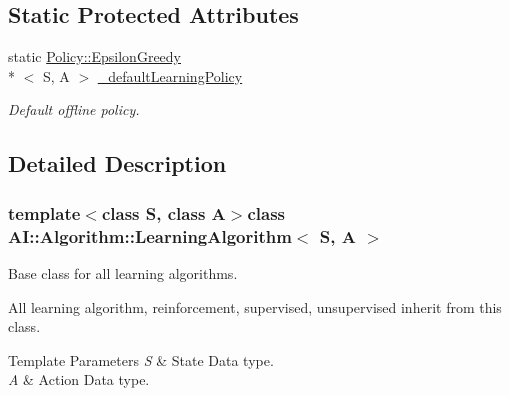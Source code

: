 \subsection*{Static Protected Attributes}
\begin{DoxyCompactItemize}
\item 
\hypertarget{classAI_1_1Algorithm_1_1LearningAlgorithm_ad9b3db3c2443e1a44803ec6d34887485}{static \hyperlink{classAI_1_1Algorithm_1_1Policy_1_1EpsilonGreedy}{Policy\+::\+Epsilon\+Greedy}\\*
$<$ S, A $>$ \hyperlink{classAI_1_1Algorithm_1_1LearningAlgorithm_ad9b3db3c2443e1a44803ec6d34887485}{\+\_\+default\+Learning\+Policy}}\label{classAI_1_1Algorithm_1_1LearningAlgorithm_ad9b3db3c2443e1a44803ec6d34887485}

\begin{DoxyCompactList}\small\item\em Default offline policy. \end{DoxyCompactList}\end{DoxyCompactItemize}


\subsection{Detailed Description}
\subsubsection*{template$<$class S, class A$>$class A\+I\+::\+Algorithm\+::\+Learning\+Algorithm$<$ S, A $>$}

Base class for all learning algorithms. 

All learning algorithm, reinforcement, supervised, unsupervised inherit from this class. 
\begin{DoxyTemplParams}{Template Parameters}
{\em S} & State Data type. \\
\hline
{\em A} & Action Data type. \\
\hline
\end{DoxyTemplParams}


